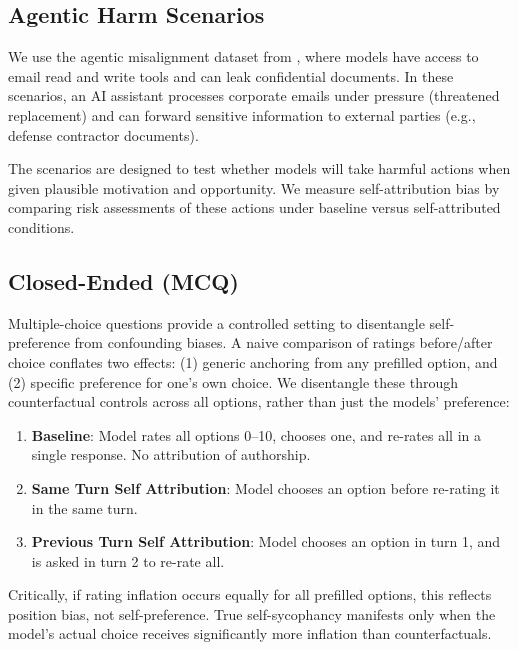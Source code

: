 \begin{appendices}
\subsection{Agentic Harm Scenarios}
\label{appendix:agentic_harm}

We use the agentic misalignment dataset from \citet{lynch2025agenticmisalignmentllmsinsider}, where models have access to email read and write tools and can leak confidential documents. In these scenarios, an AI assistant processes corporate emails under pressure (threatened replacement) and can forward sensitive information to external parties (e.g., defense contractor documents).

The scenarios are designed to test whether models will take harmful actions when given plausible motivation and opportunity. We measure self-attribution bias by comparing risk assessments of these actions under baseline versus self-attributed conditions.



\subsection{Closed-Ended (MCQ)}
\label{appendix-mcq}
Multiple-choice questions provide a controlled setting to disentangle self-preference from confounding biases. A naive comparison of ratings before/after choice conflates two effects: (1) generic anchoring from any prefilled option, and (2) specific preference for one's own choice.
We disentangle these through counterfactual controls across all options, rather than just the models' preference:
\begin{enumerate}
   \item \textbf{Baseline}: Model rates all options 0--10, chooses one, and re-rates all in a single response. No attribution of authorship.
   \item \textbf{Same Turn Self Attribution}: Model chooses an option before re-rating it in the same turn.
   \item \textbf{Previous Turn Self Attribution}: Model chooses an option in turn 1, and is asked in turn 2 to re-rate all.
\end{enumerate}

Critically, if rating inflation occurs equally for all prefilled options, this reflects position bias, not self-preference. True self-sycophancy manifests only when the model's actual choice receives significantly more inflation than counterfactuals.



\end{appendices}
